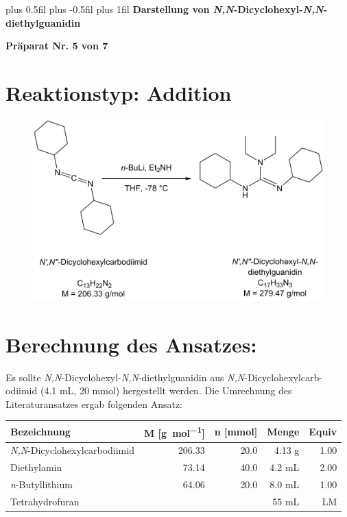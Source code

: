 \documentclass[12pt]{article}
\begin{document}
\begin{onehalfspace}

\begingroup
\leftskip=0cm plus 0.5fil \rightskip=0cm plus -0.5fil
\parfillskip=0cm plus 1fil
 \textbf{\large Darstellung von \textit{N\textquotesingle,N\textquotesingle\textquotesingle}-Dicyclohexyl-\textit{N,N}-diethylguanidin}\par
\endgroup
\begin{center}
 \textbf{Präparat Nr. 5 von 7}
\end{center}
\section{Reaktionstyp: \textnormal{Addition} }
\begin{figure}[ht]
\centering
\includegraphics[width=\textwidth]{reaktion.png}
\end{figure}


\section{Berechnung des Ansatzes: }
Es sollte \textit{N\textquotesingle,N\textquotesingle\textquotesingle}-Dicyclohexyl-\textit{N,N}-diethylguanidin aus \textit{N,N}-Dicyclohexylcarb-odiimid (4.1 \si{\milli\liter}, 20 mmol) hergestellt werden. Die Umrechnung des Literaturansatzes ergab folgenden Ansatz:\cite{vor}\par
\noindent
\begin{tabulary}{26cm}{Lrrrr}
\toprule
\textbf{ Bezeichnung }&\textbf{M [\si{\gram\per\mol}]} & \textbf{ n [\si{\milli\mol}]} & \textbf{Menge} &  \textbf{Equiv}\\
\midrule
 \textit{N,N}-Dicyclohexylcarbodiimid & 206.33 & 20.0  & 4.13 \si{\gram} & 1.00 \\
 Diethylamin   & 73.14   &  40.0  &  4.2 \si{\milli\liter} & 2.00 \\
\textit{n}-Butyllithium    & 64.06   &  20.0  &  8.0 \si{\milli\liter} & 1.00 \\
 Tetrahydrofuran &   &  & 55  \si{\milli\liter}& LM \\
\bottomrule
\end{tabulary}


\end{onehalfspace}
\end{document}
